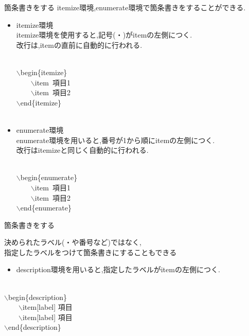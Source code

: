 \documentclass[dvipdfmx]{beamer}
\newcommand{\tbs}{$\backslash$}
\begin{document}
  \begin{frame}{箇条書きをする}
    itemize環境,enumerate環境で箇条書きをすることができる.
    \scriptsize
    \begin{itemize}
      \item itemize環境\\
            itemize環境を使用すると,記号(・)がitemの左側につく.\\
            改行は,itemの直前に自動的に行われる.\\~\\
            \begin{table}[h]
              \centering
              \tbs begin\{itemize\}\\
              ~~~~\tbs item~項目1\\
              ~~~~\tbs item~項目2\\
              \tbs end\{itemize\}\\~\\
            \end{table}
      \item enumerate環境\\
            enumerate環境を用いると,番号が1から順にitemの左側につく.\\
            改行はitemizeと同じく自動的に行われる.\\~\\
            \begin{table}[h]
              \centering
              \tbs begin\{enumerate\}\\
              ~~~~\tbs item~項目1\\
              ~~~~\tbs item~項目2\\
              \tbs end\{enumerate\}
            \end{table}
    \end{itemize}
  \end{frame}
  \begin{frame}{箇条書きをする}
    \begin{center}
      決められたラベル(・や番号など)ではなく,\\
      指定したラベルをつけて箇条書きにすることもできる
    \end{center}
    \scriptsize
    \begin{itemize}
      \item description環境を用いると,指定したラベルがitemの左側につく.\\~\\
    \end{itemize}
    \begin{table}[h]
      \centering
      \tbs begin\{description\}\\
      ~~~~\tbs item[label] 項目\\
      ~~~~\tbs item[label] 項目\\
      \tbs end\{description\}
    \end{table}
    ~\\~\\
  \end{frame}
\end{document}
